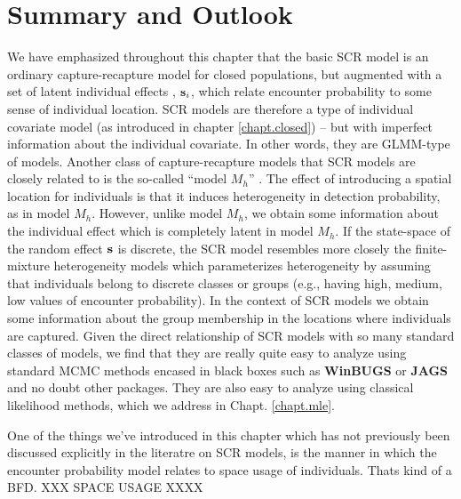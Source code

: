 {



\section{ Summary and Outlook }

We have emphasized throughout this chapter that the basic SCR
model is an ordinary capture-recapture model for
closed populations, but augmented with a set
of latent individual effects , ${\bf s}_{i}$, which relate encounter
probability to some sense of individual location. SCR models are
therefore a type of individual covariate model (as introduced in
chapter \ref{chapt.closed}) -- but with imperfect information about the
individual covariate. In other words, they are GLMM-type of models.
 Another class of capture-recapture models
that SCR models are closely related to is the so-called ``model
$M_{h}$'' \citep{otis_etal:1878, dorazio_royle:2002}.
The effect of introducing a spatial location for individuals is that
it induces heterogeneity in detection probability, as in model
$M_{h}$. However, unlike model $M_{h}$, we obtain some information
about the individual effect which is completely latent in model
$M_{h}$. If the state-space of the random effect ${\bf s}$ is discrete,
the SCR model resembles more closely the finite-mixture 
heterogeneity models \citep{norris_pollock:1996} which parameterizes
heterogeneity by assuming that individuals belong to discrete classes
or groups (e.g., having high, medium, low values of encounter probability). In the context of SCR models we
obtain some information about the group membership  in the
locations where individuals are captured.  Given the direct
relationship of SCR models with so many standard classes of models, we
find that they are really quite easy to analyze using standard MCMC
methods encased in black boxes such as {\bf WinBUGS} or {\bf JAGS} and
no doubt other packages. They are also easy to analyze using classical
likelihood methods, which we address in Chapt. \ref{chapt.mle}.

One of the things we've introduced in this chapter which has not
previously been discussed explicitly in the literatre on SCR models,
is the manner in which the encounter probability model relates to
space usage of individuals. Thats kind of a BFD. XXX SPACE USAGE XXXX

}
